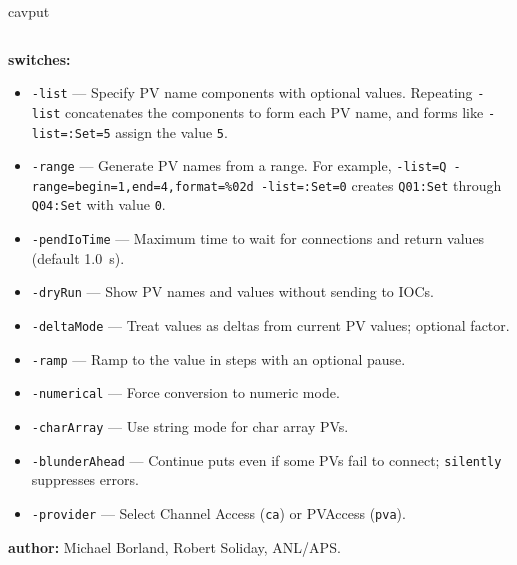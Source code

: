 \begin{sddsprog}{cavput}
\begin{verbatim}
\end{verbatim}
\item \textbf{switches:}
\begin{itemize}
  \item {\tt -list} --- Specify PV name components with optional values. Repeating
    \verb+-list+ concatenates the components to form each PV name, and
    forms like \verb+-list=:Set=5+ assign the value \verb+5+.
  \item {\tt -range} --- Generate PV names from a range. For example,
    \verb+-list=Q -range=begin=1,end=4,format=%02d -list=:Set=0+
    creates \verb+Q01:Set+ through \verb+Q04:Set+ with value \verb+0+.
  \item {\tt -pendIoTime} --- Maximum time to wait for connections and return values (default 1.0~s).
  \item {\tt -dryRun} --- Show PV names and values without sending to IOCs.
  \item {\tt -deltaMode} --- Treat values as deltas from current PV values; optional factor.
  \item {\tt -ramp} --- Ramp to the value in steps with an optional pause.
  \item {\tt -numerical} --- Force conversion to numeric mode.
  \item {\tt -charArray} --- Use string mode for char array PVs.
  \item {\tt -blunderAhead} --- Continue puts even if some PVs fail to connect; \verb|silently| suppresses errors.
  \item {\tt -provider} --- Select Channel Access ({\tt ca}) or PVAccess ({\tt pva}).
\end{itemize}
\item \textbf{author:} Michael Borland, Robert Soliday, ANL/APS.
\end{sddsprog}
